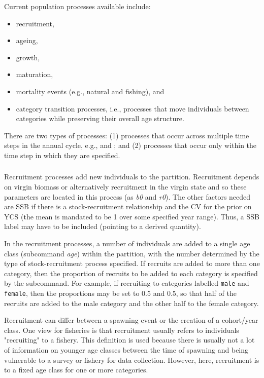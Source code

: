Current population processes available include:

\begin{itemize}
\item recruitment,
\item ageing,
\item growth,
\item maturation,
\item mortality events (e.g., natural and fishing), and
\item category transition processes, i.e., processes that move individuals between categories while preserving their overall age structure.
\end{itemize}

There are two types of processes: (1) processes that occur across multiple time steps in the annual cycle, e.g.,  and ; and (2) processes that occur only within the time step in which they are specified. 

\subsubsection{}

Recruitment processes  add new individuals to the partition. Recruitment depends on virgin biomass or alternatively recruitment in the virgin state and so these parameters are located in this process (as \textit{b0} and \textit{r0}). The other factors needed are SSB if there is a stock-recruitment relationship and the CV for the prior on YCS (the mean is mandated to be 1 over some specified year range). Thus, a SSB label may have to be included (pointing to a derived quantity).
 
In the recruitment processes, a number of individuals are added to a single age class (subcommand \textit{age}) within the partition, with the number determined by the type of stock-recruitment process specified. If recruits are added to more than one category, then the proportion of recruits to be added to each category is specified by the  subcommand. For example, if recruiting to categories labelled \texttt{male} and \texttt{female}, then the proportions may be set to $0.5$ and $0.5$, so that half of the recruits are added to the male category and the other half to the female category.

Recruitment can differ between a spawning event or the creation of a cohort/year class. One view for fisheries is that recruitment usually refers to individuals "recruiting" to a fishery. This definition is used because there is usually not a lot of information on younger age classes between the time of spawning and being vulnerable to a survey or fishery for data collection. However, here, recruitment is to a fixed age class for one or more categories. 


